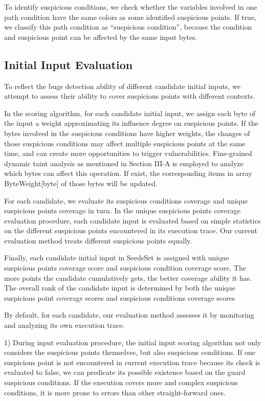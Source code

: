 To identify suspicious conditions, we check whether the variables involved in one path condition have the same colors as some identified suspicious points. If true, we classify this path condition as ``suspicious condition'', because the condition and suspicious point can be affected by the same input bytes.

\subsection{Initial Input Evaluation}
To reflect the bugs detection ability of different candidate initial inputs, we attempt to assess their ability to cover suspicious points with different contexts.

In the scoring algorithm, for each candidate initial input, we assign each byte of the input a weight approximating its influence degree on suspicious points.
If the bytes involved in the suspicious conditions have higher weights, the changes of those suspicious conditions may affect multiple suspicious points at the same time, and can create more opportunities to trigger vulnerabilities.
Fine-grained dynamic taint analysis as mentioned in Section III-A is employed to analyze which bytes can affect this operation. 
If exist, the corresponding items in array ByteWeight[byte] of those bytes will be updated.

For each candidate, we evaluate its suspicious conditions coverage and unique suspicious points coverage in turn.
In the unique suspicious points coverage evaluation procedure, each candidate input is evaluated based on simple statistics on the different suspicious points encountered in its execution trace. 
Our current evaluation method treats different suspicious points equally.

Finally, each candidate initial input in SeedsSet is assigned with unique suspicious points coverage score and suspicious condition coverage score.
The more points the candidate cumulatively gets, the better coverage ability it has. 
The overall rank of the candidate input is determined by both the unique suspicious point coverage scores and suspicious conditions coverage scores

By default, for each candidate, our evaluation method assesses it by monitoring and analyzing its own execution trace.

1) During input evaluation procedure, the initial input scoring algorithm not only considers the suspicious points themselves, but also suspicious conditions.
If one suspicious point is not encountered in current execution trace because its check is evaluated to false, we can predicate its possible existence based on the guard suspicious conditions.
If the execution covers more and complex suspicious conditions, it is more prone to errors than other straight-forward ones.


